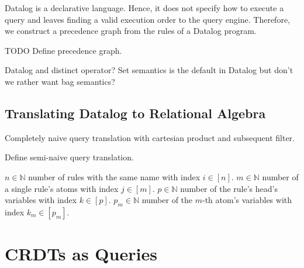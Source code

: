 Datalog is a declarative language. Hence, it does not specify how to execute
a query and leaves finding a valid execution order to the query engine.
Therefore, we construct a precedence graph from the rules of a Datalog program.

TODO Define precedence graph.

Datalog and distinct operator? Set semantics is the default in Datalog but don't
we rather want bag semantics?

\subsection{Translating Datalog to Relational Algebra}


Completely naive query translation with cartesian product and subsequent filter.

Define semi-naive query translation.

\(n \in \mathbb{N}\) number of rules with the same name with index \(i \in [n]\).
\(m \in \mathbb{N}\) number of a single rule's atoms with index \(j \in [m]\).
\(p \in \mathbb{N}\) number of the rule's head's variables with index \(k \in [p]\).
\(p_m \in \mathbb{N}\) number of the \(m\)-th atom's variables with index \(k_m \in [p_m]\).



\section{\acp{CRDT} as Queries}
